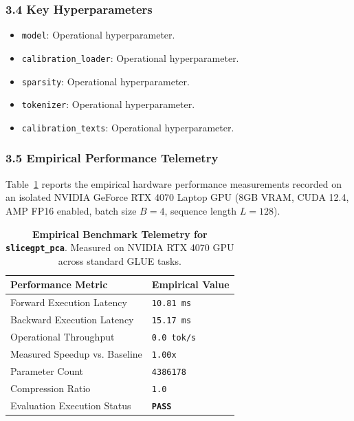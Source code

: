 \subsubsection*{3.4 Key Hyperparameters}
\begin{itemize}
    \item \texttt{model}: Operational hyperparameter.
    \item \texttt{calibration\_loader}: Operational hyperparameter.
    \item \texttt{sparsity}: Operational hyperparameter.
    \item \texttt{tokenizer}: Operational hyperparameter.
    \item \texttt{calibration\_texts}: Operational hyperparameter.
\end{itemize}

\subsubsection*{3.5 Empirical Performance Telemetry}
Table~\ref{tab:telemetry_slicegpt\_pca} reports the empirical hardware performance measurements recorded on an isolated NVIDIA GeForce RTX 4070 Laptop GPU (8GB VRAM, CUDA 12.4, AMP FP16 enabled, batch size $B=4$, sequence length $L=128$).

\begin{table}[h]
\centering
\small
\caption{\textbf{Empirical Benchmark Telemetry for \texttt{slicegpt\_pca}}. Measured on NVIDIA RTX 4070 GPU across standard GLUE tasks.}
\label{tab:telemetry_slicegpt\_pca}
\begin{tabularx}{\columnwidth}{lX}
\toprule
\textbf{Performance Metric} & \textbf{Empirical Value} \\
\midrule
Forward Execution Latency & \texttt{10.81 ms} \\
Backward Execution Latency & \texttt{15.17 ms} \\
Operational Throughput & \texttt{0.0 tok/s} \\
Measured Speedup vs. Baseline & \texttt{1.00x} \\
Parameter Count & \texttt{4386178} \\
Compression Ratio & \texttt{1.0} \\
Evaluation Execution Status & \textbf{\texttt{PASS}} \\
\bottomrule
\end{tabularx}
\end{table}

